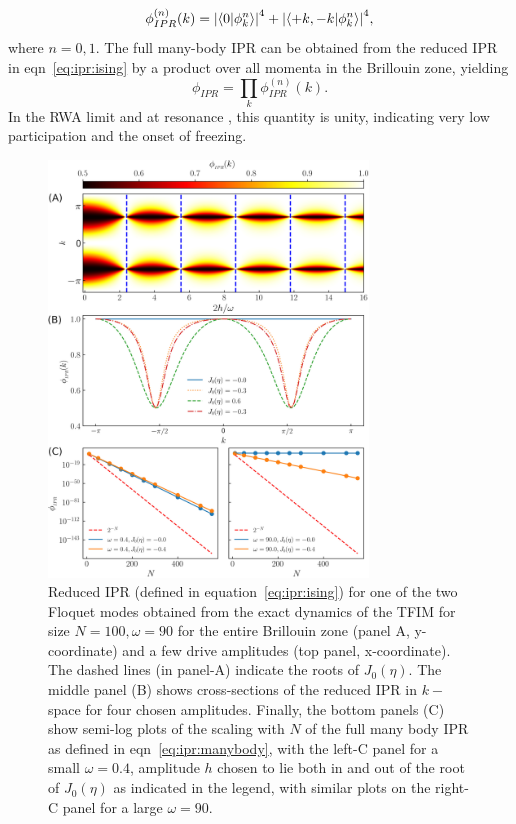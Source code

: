 \documentclass[%
reprint,
superscriptaddress,
amsmath,amssymb,
aps,
prb,
showkeys,
]{revtex4-2}
\begin{document}
\begin{equation}
\label{eq:ipr:ising}
\phi^{(n)}_{IPR}(k) = \abs{\ip{0}{\phi^n_k}}^4 + \abs{\ip{ +k, -k }{\phi^n_k}}^4,
\end{equation}
where $n=0,1$. {The full many-body IPR can be obtained from the reduced IPR in eqn}~\ref{eq:ipr:ising} {by a product over all momenta in the Brillouin zone, yielding}
\begin{equation}
	\label{eq:ipr:manybody}
	\phi_{IPR} = \prod_k \phi^{(n)}_{IPR}(k).
\end{equation}
In the RWA limit and at resonance , this quantity is unity, indicating very low participation and the onset of freezing.
\begin{figure}[t!]
	\centering
	\includegraphics[width = 8.5cm]{ising_exact_ipr_3panel1.jpeg}
	\caption{Reduced IPR (defined in equation~\ref{eq:ipr:ising}) {for one of the two Floquet modes obtained from the exact dynamics of the TFIM for size} $N = 100, \omega=90$ {for the entire Brillouin zone (panel A, y-coordinate) and a few drive amplitudes (top panel, x-coordinate). The dashed lines (in panel-A) indicate the roots of} $J_0(\eta)${. The middle panel (B) shows cross-sections of the reduced IPR in} $k-$ {space for four chosen amplitudes. Finally, the bottom panels (C) show semi-log plots of the scaling with} $N$ {of the full many body IPR as defined in eqn}~\ref{eq:ipr:manybody}{, with the left-C panel for a small} $\omega=0.4$, amplitude $h$ {chosen to lie both in and out of the root of} $J_0(\eta)$ {as indicated in the legend, with similar plots on the right-C panel for a large} $\omega=90$. }
	\label{fig:ipr:tfim}
\end{figure}
\end{document}
